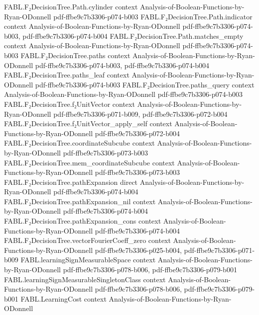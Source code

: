 \begin{theorem}
\proofstep
  {FABL.F₂DecisionTree.Path.cylinder}
  {context}
  {Analysis-of-Boolean-Functions-by-Ryan-ODonnell}
  {pdf-ffbe9c7b3306-p074-b003}
\proofstep
  {FABL.F₂DecisionTree.Path.indicator}
  {context}
  {Analysis-of-Boolean-Functions-by-Ryan-ODonnell}
  {pdf-ffbe9c7b3306-p074-b003,
    pdf-ffbe9c7b3306-p074-b004}
\proofstep
  {FABL.F₂DecisionTree.Path.matches_empty}
  {context}
  {Analysis-of-Boolean-Functions-by-Ryan-ODonnell}
  {pdf-ffbe9c7b3306-p074-b003}
\proofstep
  {FABL.F₂DecisionTree.paths}
  {context}
  {Analysis-of-Boolean-Functions-by-Ryan-ODonnell}
  {pdf-ffbe9c7b3306-p074-b003,
    pdf-ffbe9c7b3306-p074-b004}
\proofstep
  {FABL.F₂DecisionTree.paths_leaf}
  {context}
  {Analysis-of-Boolean-Functions-by-Ryan-ODonnell}
  {pdf-ffbe9c7b3306-p074-b003}
\proofstep
  {FABL.F₂DecisionTree.paths_query}
  {context}
  {Analysis-of-Boolean-Functions-by-Ryan-ODonnell}
  {pdf-ffbe9c7b3306-p074-b003}
\proofstep
  {FABL.F₂DecisionTree.f₂UnitVector}
  {context}
  {Analysis-of-Boolean-Functions-by-Ryan-ODonnell}
  {pdf-ffbe9c7b3306-p071-b009,
    pdf-ffbe9c7b3306-p072-b004}
\proofstep
  {FABL.F₂DecisionTree.f₂UnitVector_apply_self}
  {context}
  {Analysis-of-Boolean-Functions-by-Ryan-ODonnell}
  {pdf-ffbe9c7b3306-p072-b004}
\proofstep
  {FABL.F₂DecisionTree.coordinateSubcube}
  {context}
  {Analysis-of-Boolean-Functions-by-Ryan-ODonnell}
  {pdf-ffbe9c7b3306-p073-b003}
\proofstep
  {FABL.F₂DecisionTree.mem_coordinateSubcube}
  {context}
  {Analysis-of-Boolean-Functions-by-Ryan-ODonnell}
  {pdf-ffbe9c7b3306-p073-b003}
\proofstep
  {FABL.F₂DecisionTree.pathExpansion}
  {direct}
  {Analysis-of-Boolean-Functions-by-Ryan-ODonnell}
  {pdf-ffbe9c7b3306-p074-b004}
\proofstep
  {FABL.F₂DecisionTree.pathExpansion_nil}
  {context}
  {Analysis-of-Boolean-Functions-by-Ryan-ODonnell}
  {pdf-ffbe9c7b3306-p074-b004}
\proofstep
  {FABL.F₂DecisionTree.pathExpansion_cons}
  {context}
  {Analysis-of-Boolean-Functions-by-Ryan-ODonnell}
  {pdf-ffbe9c7b3306-p074-b004}
\proofstep
  {FABL.F₂DecisionTree.vectorFourierCoeff_zero}
  {context}
  {Analysis-of-Boolean-Functions-by-Ryan-ODonnell}
  {pdf-ffbe9c7b3306-p025-b004,
    pdf-ffbe9c7b3306-p071-b009}
\proofstep
  {FABL.learningSignMeasurableSpace}
  {context}
  {Analysis-of-Boolean-Functions-by-Ryan-ODonnell}
  {pdf-ffbe9c7b3306-p078-b006,
    pdf-ffbe9c7b3306-p079-b001}
\proofstep
  {FABL.learningSignMeasurableSingletonClass}
  {context}
  {Analysis-of-Boolean-Functions-by-Ryan-ODonnell}
  {pdf-ffbe9c7b3306-p078-b006,
    pdf-ffbe9c7b3306-p079-b001}
\proofstep
  {FABL.LearningCost}
  {context}
  {Analysis-of-Boolean-Functions-by-Ryan-ODonnell}

\end{theorem}
